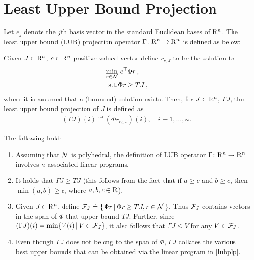 \section{Least Upper Bound Projection}\label{sec:lubp}
Let $e_j$ denote the $j$th basis vector in the standard Euclidean bases of $\mathrm{R}^n$.
The least upper bound (LUB) projection operator $\Gamma \colon \mathrm{R}^n \rightarrow\mathrm{R}^n$ is defined as below:
\begin{definition}\label{lubpop}
Given $J\in \mathrm{R}^n$, $c\in \mathrm{R}^n$ positive-valued vector define $r_{c,J}$ to be the solution to 
\begin{align}
\label{lubplp}
\begin{split}
 \underset{r\in \N}{\min} &\,\, c^\top \Phi r\,,\\
 \text{s.t.}& \mb \Phi r\geq  TJ\,,
 \end{split}
\end{align}
where it is assumed that a (bounded) solution exists.
Then, for $J\in \mathrm{R}^n$, $\Gamma J$,
the least upper bound projection of $J$ is defined as 
\begin{align}\label{gamdef}
(\Gamma J)(i)\eqdef(\Phi r_{e_i,J})(i),\quad i=1,\ldots,n\,.
\end{align}
\end{definition}
\begin{remark}\label{lubremark}
The following hold: 
\begin{enumerate}
\item Assuming that $\mathcal{N}$ is polyhedral, 
	the definition of LUB operator $\Gamma \colon \mathrm{R}^n \rightarrow \mathrm{R}^n$ involves $n$ associated linear programs.
\item It holds that $\Gamma J\geq TJ$ (this follows from the fact that if $a\geq c$ and $b\geq c$, then $\min(a,b)\geq c$, where $a, b, c \in \mathrm{R}$).
\item Given $J\in \mathrm{R}^n$, define $\mathcal{F}_J\doteq\{\,\Phi r\,|\,\Phi r\geq TJ, r\in \mathcal{N}\,\}$. 
Thus $\mathcal{F}_J$ contains vectors in the span of $\Phi$ that upper bound $TJ$. 
Further, since $(\Gamma J)(i) = \min\{ V(i) \,|\, V\in \mathcal{F}_J \}$, it also follows that $\Gamma J \le V$ for any $V\in \mathcal{F}_J$.
\item Even though $\Gamma J$ does not belong to the span of $\Phi$, $\Gamma J$ collates the various best upper bounds that can be obtained via the linear program in \eqref{lubplp}.
\begin{comment}
\item The LUB operator $\Gamma$ in \eqref{gamdef} bears close similarity to the ALP in \eqref{alp}.
In fact, it is not hard to observe that $(\Gamma J)(i) = (\Phi r_{e_i})(i)$ for any $1\le i \le n$; the reason $\Gamma$ is defined the way it is so that this resembles to \eqref{alp} will be clear. 
\end{comment}
\end{enumerate}
\end{remark}
